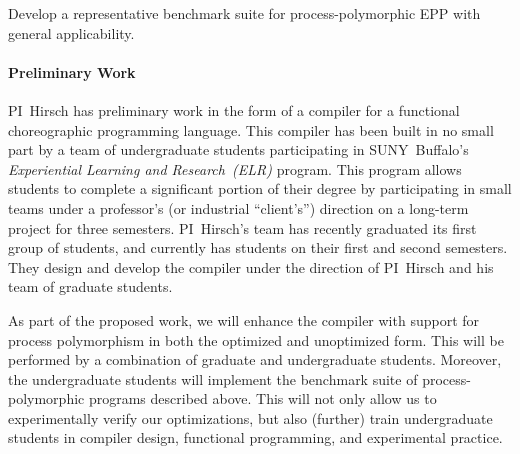 \begin{goal}
  \label{goal:benchmark}
  Develop a representative benchmark suite for process-polymorphic EPP with general applicability.
\end{goal}

%
%
%

\paragraph{Preliminary Work}
PI~Hirsch has preliminary work in the form of a compiler for a functional choreographic programming language.
This compiler has been built in no small part by a team of undergraduate students participating in SUNY~Buffalo's \emph{Experiential Learning and Research~(ELR)} program.
This program allows students to complete a significant portion of their degree by participating in small teams under a professor's (or industrial ``client's'') direction on a long-term project for three semesters.
PI~Hirsch's team has recently graduated its first group of students, and currently has students on their first and second semesters.
They design and develop the compiler under the direction of PI~Hirsch and his team of graduate students.

As part of the proposed work, we will enhance the compiler with support for process polymorphism in both the optimized and unoptimized form.
This will be performed by a combination of graduate and undergraduate students.
Moreover, the undergraduate students will implement the benchmark suite of process-polymorphic programs described above.
This will not only allow us to experimentally verify our optimizations, but also (further) train undergraduate students in compiler design, functional programming, and experimental practice.

